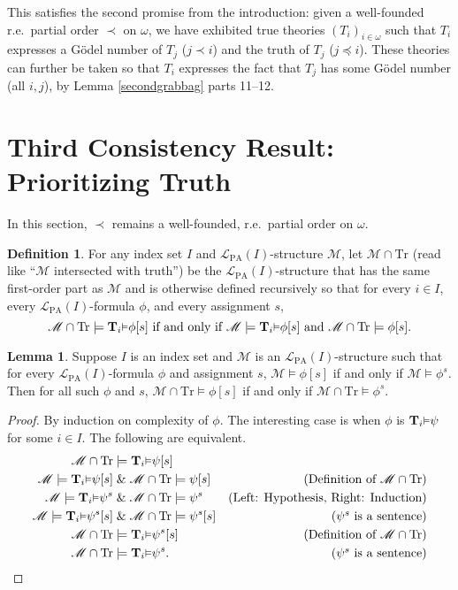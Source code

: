 \documentclass[reqno]{article}
\theoremstyle{definition}
\newtheorem{lemma}[theorem]{Lemma}
\newtheorem{definition}[theorem]{Definition}
\def\L{\mathscr{L}}
\def\M{\mathscr{M}}
\def\T{\mathbf{T}}
\def\LPA{\L_{\mathrm{PA}}}
\def\Tr{\mathrm{Tr}}
\def\ctr{\cap\Tr}
\renewcommand{\Pr}[1]{\T_{#1}\mbox{\small${\vDash}$}}
\begin{document}
This satisfies the second promise from the introduction:
given a well-founded r.e.~partial order $\prec$ on $\omega$,
we have exhibited true theories $(T_i)_{i\in\omega}$ such that $T_i$ expresses 
a G\"odel number of $T_j$ ($j\prec i$) and the truth of $T_j$ ($j\preceq 
i$).  These theories can further be taken so that $T_i$ expresses the fact 
that $T_j$ has some G\"odel number (all $i,j$), by Lemma \ref{secondgrabbag} parts 11--12.


\section{Third Consistency Result: Prioritizing Truth}


In this section, $\prec$ remains a well-founded, r.e.~partial order on 
$\omega$.


\begin{definition}
For any index set $I$ and $\LPA(I)$-structure
$\M$, let $\M\cap\Tr$ (read like ``$\M$ intersected with truth'')
be the $\LPA(I)$-structure that has
the same first-order part as $\M$ and is otherwise
defined recursively so that for every $i\in I$,
every $\LPA(I)$-formula $\phi$,
and every assignment $s$,
\[
\mbox{$\M\cap\Tr \models \Pr i\phi[s]$ if and only if
$\M\models \Pr i\phi[s]$ and $\M\cap\Tr\models \phi[s]$.}
\]
\end{definition}

\begin{lemma}
\label{captruepreservesintent}
Suppose 
$I$ is an index set and $\M$ is an $\LPA(I)$-structure
such that for every $\LPA(I)$-formula $\phi$ and assignment $s$,
$\M\models\phi[s]$ if and only if $\M\models\phi^s$.
Then for all such $\phi$ and $s$,
$\M\cap\Tr\models\phi[s]$ if and only if $\M\cap\Tr\models\phi^s$.
\end{lemma}

\begin{proof}
By induction on complexity of $\phi$.
The interesting case is when $\phi$ is $\Pr i\psi$ for some $i\in I$.
The following are equivalent.
\begin{align*}
\M\ctr &\models \Pr i\psi[s]\\
\M \models \Pr i \psi[s] &\mathrel\& \M\ctr \models \psi[s]
  &\mbox{(Definition of $\M\ctr$)}\\
\M \models \Pr i\psi^s &\mathrel\& \M\ctr \models \psi^s
  &\mbox{(Left: Hypothesis, Right: Induction)}\\
\M \models \Pr i\psi^s[s] &\mathrel\& \M\ctr \models \psi^s[s]
  &\mbox{($\psi^s$ is a sentence)}\\
\M\ctr &\models \Pr i\psi^s[s]
  &\mbox{(Definition of $\M\ctr$)}\\
\M\ctr &\models \Pr i \psi^s.
  &\mbox{($\psi^s$ is a sentence)}
\end{align*}
\end{proof}
\end{document}
